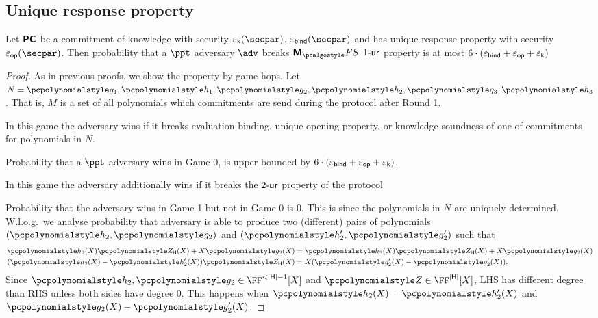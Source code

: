 \subsection{Unique response property}
\begin{lemma}\label{lem:marlinprot_ur}
  Let $\bm{\mathsf{PC}}$ be a commitment of knowledge with security $\epsk(\secpar)$,
  $\epsbind(\secpar)$ and has unique response property with security
  $\epsop(\secpar)$. Then probability that a $\ppt$ adversary $\adv$ breaks
  $\marlinprotfs$ ${1\text{-}\mathsf{ur}}$ property is at most
  $6 \cdot (\varepsilon_{\mathsf{bind}} + \varepsilon_{\mathsf{op}} + \varepsilon_{\mathsf{k}})$ 
\end{lemma}
\begin{proof}
  As in previous proofs, we show the property by game hops. Let
  $N = \p{g_1}, \p{h_1}, \p{g_2}, \p{h_2}, \p{g_3}, \p{h_3}$. That is, $M$ is a
  set of all polynomials which commitments are send during the protocol after
  Round 1.

   In this game the adversary wins if it breaks evaluation
  binding, unique opening property, or knowledge soundness of one of commitments
  for polynomials in $N$.

  Probability that a $\ppt$ adversary wins in Game 0, is upper bounded by $6
  \cdot (\varepsilon_{\mathsf{bind}} + \varepsilon_{\mathsf{op}} + \varepsilon_{\mathsf{k}})$.

   In this game the adversary additionally wins if it breaks the
  ${2\text{-}\mathsf{ur}}$ property of the protocol

   Probability that the adversary wins in
  Game 1 but not in Game 0 is $0$. This is since the polynomials in $N$ are
  uniquely determined. W.l.o.g.~we analyse probability that adversary is able to
  produce two (different) pairs of polynomials $(\p{h_2}, \p{g_2})$ and $(\p{h'_2},
  \p{g'_2})$ such that
  \begin{align*}
    \p{h_2} (X) \ZERO_{\HHH} (X) + X \p{g_2} (X) & = \p{h_2} (X) \ZERO_{\HHH} (X) +
                                                   X \p{g_2} (X)\\
    (\p{h_2} (X) - \p{h'_2} (X)) \ZERO_{\HHH} (X) & = X (\p{g'_2} (X) - \p{g'_2}
    (X)).
  \end{align*}
  Since $\p{h_2}, \p{g_2} \in \FF^{< |\HHH| - 1} [X]$ and
  $\ZERO \in \FF^{|\HHH|} [X]$, LHS has different degree than RHS unless both
  sides have degree $0$. This happens when $\p{h_2} (X) = \p{h'_2} (X)$ and
  $\p{g_2} (X) - \p{g'_2} (X)$.
\end{proof}

